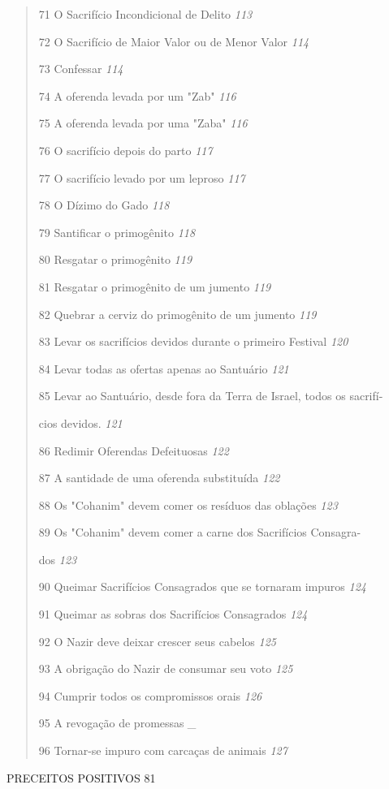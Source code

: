 \begin{quote}
71 O Sacrifício Incondicional de Delito \emph{113}

72 O Sacrifício de Maior Valor ou de Menor Valor \emph{114}

73 Confessar \emph{114}

74 A oferenda levada por um "Zab" \emph{116}

75 A oferenda levada por uma "Zaba" \emph{116}

76 O sacrifício depois do parto \emph{117}

77 O sacrifício levado por um leproso \emph{117}

78 O Dízimo do Gado \emph{118}

79 Santificar o primogênito \emph{118}

80 Resgatar o primogênito \emph{119}

81 Resgatar o primogênito de um jumento \emph{119}

82 Quebrar a cerviz do primogênito de um jumento \emph{119}

83 Levar os sacrifícios devidos durante o primeiro Festival \emph{120}

84 Levar todas as ofertas apenas ao Santuário \emph{121}

85 Levar ao Santuário, desde fora da Terra de Israel, todos os sacrifí-

cios devidos. \emph{121}

86 Redimir Oferendas Defeituosas \emph{122}

87 A santidade de uma oferenda substituída \emph{122}

88 Os "Cohanim" devem comer os resíduos das oblações \emph{123}

89 Os "Cohanim" devem comer a carne dos Sacrifícios Consagra-

dos \emph{123}

90 Queimar Sacrifícios Consagrados que se tornaram impuros \emph{124}

91 Queimar as sobras dos Sacrifícios Consagrados \emph{124}

92 O Nazir deve deixar crescer seus cabelos \emph{125}

93 A obrigação do Nazir de consumar seu voto \emph{125}

94 Cumprir todos os compromissos orais \emph{126}

95 A revogação de promessas \emph{\_}

96 Tornar-se impuro com carcaças de animais \emph{127}
\end{quote}

PRECEITOS POSITIVOS 81

